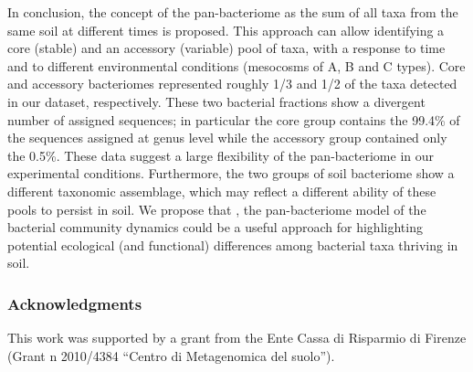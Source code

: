 In conclusion, the concept of the pan-bacteriome as the sum of all taxa from the same soil at different times is proposed. This approach can allow identifying a core (stable) and an accessory (variable) pool of taxa, with a response to time and to different environmental conditions (mesocosms of A, B and C types). Core and accessory bacteriomes represented roughly 1/3 and 1/2 of the taxa detected in our dataset, respectively. These two bacterial fractions show a divergent number of assigned sequences; in particular the core group contains the 99.4\% of the sequences assigned at genus level while the accessory group contained only the 0.5\%. These data suggest a large flexibility of the pan-bacteriome in our experimental conditions. Furthermore, the two groups of soil bacteriome show a different taxonomic assemblage, which may reflect a different ability of these pools to persist in soil. We propose that , the pan-bacteriome model of the bacterial community dynamics could be a useful approach for highlighting potential ecological (and functional) differences among bacterial taxa thriving in soil.\\

\subsubsection{Acknowledgments}
This work was supported by a grant from the Ente Cassa di Risparmio di Firenze (Grant n{\textdegree} 2010/4384 ``Centro di Metagenomica del suolo''). 


\backmatter
{}
\renewcommand{\sectionmark}[1]{\markright{#1}}
\sectionmark{Bibliography}

